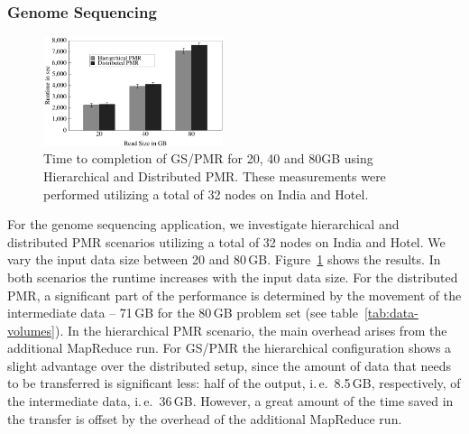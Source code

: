 \documentclass{sig-alternate}
\newcommand{\upp}{\vspace*{-0.5em}}
\begin{document}
\upp\upp
\subsubsection*{Genome Sequencing}

\begin{figure}[t]
	\centering
		\includegraphics[width=0.47\textwidth]{figures/gs_hihmr_dpmr.pdf}
                \caption{Time to completion of GS/PMR for 20, 40 and
                  80GB using Hierarchical and Distributed PMR. These
                  measurements were performed utilizing a total of 32
                  nodes on India and Hotel. \upp\upp\upp}
\label{fig:gs_hihmr_dpmr}
\end{figure}		

For the genome sequencing application, we investigate hierarchical and
distributed PMR scenarios utilizing a total of 32 nodes on India and
Hotel. We vary the input data size between 20 and 80\,GB.
Figure~\ref{fig:gs_hihmr_dpmr} shows the results. In both scenarios
the runtime increases with the input data size. For the distributed
PMR, a significant part of the performance is determined by the
movement of the intermediate data -- 71\,GB for the 80\,GB problem set
(see table~\ref{tab:data-volumes}). In the hierarchical PMR scenario,
the main overhead arises from the additional MapReduce run. For GS/PMR
the hierarchical configuration shows a slight advantage over the
distributed setup, since the amount of data that needs to be
transferred is significant less: half of the output, i.\,e.\ 8.5\,GB,
respectively, of the intermediate data, i.\,e.\ 36\,GB. However, a
great amount of the time saved in the transfer is offset by the
overhead of the additional MapReduce run.
\end{document}
